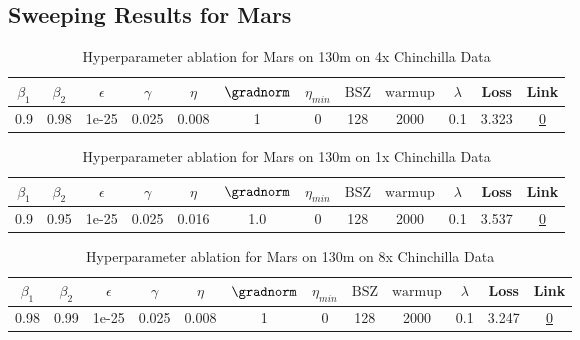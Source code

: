 \subsection{Sweeping Results for Mars}%
\begin{table}[H]
\centering
\caption{Hyperparameter ablation for Mars on 130m on 4x Chinchilla Data}
\label{tab:ablation_mars_130m_4}
\begin{tabular}{cccccccccccc}
\toprule
$\beta_1$ & $\beta_2$ & $\epsilon$ & $\gamma$ & $\eta$ & $\gradnorm$ & $\eta_{min}$ & $\mathrm{BSZ}$ & $\mathrm{warmup}$ & $\lambda$ & Loss & Link \\
\midrule
0.9 & 0.98 & 1e-25 & 0.025 & 0.008 & 1 & 0 & 128 & 2000 & 0.1 & 3.323 & \href{https://wandb.ai/stanford-mercury/optimizer-scaling/runs/sweep-130m-10B-marsb8cf3flr0.008-wd0.1-minlr0-warmup2000-b10.9-b-5a2278}{0} \\
\midrule
\bottomrule
\end{tabular}
\end{table}

\begin{table}[H]
\centering
\caption{Hyperparameter ablation for Mars on 130m on 1x Chinchilla Data}
\label{tab:ablation_mars_130m_1}
\begin{tabular}{cccccccccccc}
\toprule
$\beta_1$ & $\beta_2$ & $\epsilon$ & $\gamma$ & $\eta$ & $\gradnorm$ & $\eta_{min}$ & $\mathrm{BSZ}$ & $\mathrm{warmup}$ & $\lambda$ & Loss & Link \\
\midrule
0.9 & 0.95 & 1e-25 & 0.025 & 0.016 & 1.0 & 0 & 128 & 2000 & 0.1 & 3.537 & \href{https://wandb.ai/stanford-mercury/optimizer-scaling/runs/sweep-130m-2B-mars692316lr0.016-wd0.1-minlr0-warmup2000-b10.9-b2-93e276}{0} \\
\midrule
\bottomrule
\end{tabular}
\end{table}

\begin{table}[H]
\centering
\caption{Hyperparameter ablation for Mars on 130m on 8x Chinchilla Data}
\label{tab:ablation_mars_130m_8}
\begin{tabular}{cccccccccccc}
\toprule
$\beta_1$ & $\beta_2$ & $\epsilon$ & $\gamma$ & $\eta$ & $\gradnorm$ & $\eta_{min}$ & $\mathrm{BSZ}$ & $\mathrm{warmup}$ & $\lambda$ & Loss & Link \\
\midrule
0.98 & 0.99 & 1e-25 & 0.025 & 0.008 & 1 & 0 & 128 & 2000 & 0.1 & 3.247 & \href{https://wandb.ai/stanford-mercury/optimizer-scaling/runs/sweep-130m-21B-marse0bd33lr0.008-wd0.1-minlr0-warmup2000-b10.98--8e8f56}{0} \\
\midrule
\bottomrule
\end{tabular}
\end{table}

